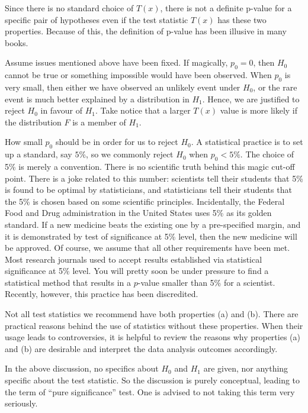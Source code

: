 Since there is no standard choice of $T(x)$, there is not
a definite p-value for a specific pair of hypotheses even if
the test statistic $T(x)$ has these two properties. Because
of this, the definition of p-value has been illusive in many
books.

Assume issues mentioned above have been fixed.
If magically, $p_0 = 0$, then $H_0$ cannot be true
or something impossible would have been observed.
When $p_0$ is very small, then either we have observed
an unlikely event under $H_0$, or the rare event is
much better explained by a distribution in $H_1$.
Hence, we are justified to reject $H_0$ in favour of $H_1$.
Take notice that a larger $T(x)$ value is more likely
if the distribution $F$ is a member of $H_1$.

How small $p_0$ should be in order for us to reject $H_0$.
A statistical practice is to set up a standard, say $5\%$, so
we commonly reject $H_0$ when $p_0 < 5\%$.
The choice of 5\% is merely a convention.
There is no scientific truth behind this magic cut-off point. There is a
joke related to this number: scientists tell their students that 5\% is
found to be optimal by statisticians, and statisticians tell their students
that the 5\% is chosen based on some scientific principles.
Incidentally, the Federal Food and Drug administration in the United
States uses 5\% as its golden standard. If a new medicine beats
the existing one by a pre-specified margin, and it is demonstrated
by test of significance at 5\% level, then the new medicine
will be approved. Of course, we assume that all other requirements
have been met. Most research journals used to accept results established
via statistical significance at 5\% level. You will pretty soon be
under pressure to find a statistical method that results in a $p$-value
smaller than 5\% for a scientist.
Recently, however, this practice has been discredited.

Not all test statistics we recommend have both properties (a) and (b).
There are practical reasons behind the use of statistics without these 
properties. 
When their usage leads to controversies, it is helpful to review the 
reasons why properties (a) and (b) are
desirable and interpret the data analysis outcomes accordingly.

In the above discussion, no specifics about $H_0$ and $H_1$ are
given, nor anything specific about the test statistic. So the discussion
is purely conceptual, leading to the term of ``pure significance'' test.
One is advised to not taking this term very seriously.

